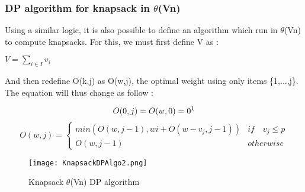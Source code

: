 \subsubsection{DP algorithm for knapsack in $\theta$(Vn)}

Using a similar logic, it is also possible to define an algorithm which run in 
$\theta$(Vn) to compute knapsacks. For this, we must first define V as :\newline

\begin{center}
\Large{$V = \sum_{i \in I} v_i$}
\end{center}

And then redefine O(k,j) as O(w,j), the optimal weight using only items \{1,...,j\}. The equation will thus change as follow :

\[ O(0,j) = O(w,0) = 0 \text{\footnotemark} \]
\[ O(w,j) = \begin{cases}
      min(O(w,j-1), wi + O(w-v_j,j-1)) & if \quad v_j \leq p \\
      O(w,j-1) & otherwise
   \end{cases}
\]

\begin{figure}[!ht]
    \centering
    \texttt{[image: KnapsackDPAlgo2.png]}
    \caption{Knapsack $\theta$(Vn) DP algorithm}
    \label{fig:Knapsack_example}
\end{figure}
\FloatBarrier
